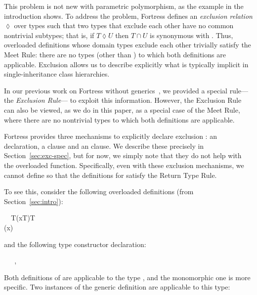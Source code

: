 \documentclass[10pt]{sigplanconf}
\newcommand{\exc}{\mathrel{\lozenge}}
\newcommand{\Bottom}{\TYP{Bottom}}
\begin{document}
This problem is not new with parametric polymorphism, 
as the  example in the introduction shows.
To address the problem, 
Fortress defines an \emph{exclusion relation} $\exc$ over types
such that two types that exclude each other 
have no common nontrivial subtypes;
that is, 
if $T \exc U$ then $T \cap U$ is synonymous with \Bottom.
Thus, overloaded definitions whose domain types exclude each other
trivially satisfy the Meet Rule: 
there are no types (other than \Bottom) 
to which both definitions are applicable.
Exclusion allows us to describe explicitly what is 
typically implicit in single-inheritance class hierarchies.

In our previous work on Fortress without generics~\cite{allen07}, 
we provided a special rule---the \emph{Exclusion Rule}---%
to exploit this information.
However, 
the Exclusion Rule can also be viewed, 
as we do in this paper, 
as a special case of the Meet Rule, 
where there are no nontrivial types 
to which both definitions are applicable.

Fortress provides three mechanisms to explicitly declare exclusion \cite{Fortress}:
an  declaration, a  clause and an  clause.
We describe these precisely in Section~\ref{sec:exc-spec}, 
but for now, we simply note that 
they do not help with the overloaded  function.
Specifically,
even with these exclusion mechanisms, 
we cannot define  
so that the definitions for  satisfy the Return Type Rule.

To see this, 
consider the following overloaded definitions (from Section~\ref{sec:intro}):

\small
\begin{FortressCode}
{\tt ~~}\+\llbracket{}T\rrbracket\bigl(x\COLON {}\llbracket{}T\rrbracket\bigr)\COLON {}\llbracket{}T\rrbracket \\
  \bigl(x\COLON {}\llbracket{}\rrbracket\bigr)\COLON {}\llbracket{}\rrbracket\-
\end{FortressCode}
\normalsize
and the following type constructor declaration:

\small
\begin{FortressCode}
{\tt ~~}\+ \SHORTCUT{<} \bigl\lbrace\,\llbracket{}\rrbracket, \llbracket{}\rrbracket\,\bigr\rbrace\-
\end{FortressCode}
\normalsize
Both definitions of  are applicable to the type ,
and the monomorphic one is more specific.
Two instances of the generic definition are applicable to this type:
\end{document}
